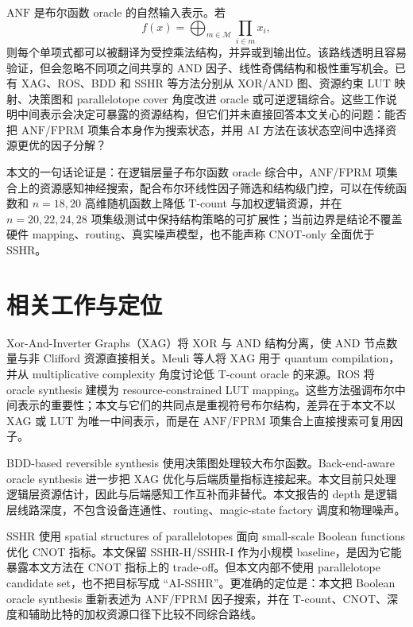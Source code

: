 \documentclass[UTF8,fontset=macnew,11pt]{ctexart}
\newcommand{\anf}{\ensuremath{\mathrm{ANF}}}
\newcommand{\fprm}{\ensuremath{\mathrm{FPRM}}}
\begin{document}
\anf{} 是布尔函数 oracle 的自然输入表示。若
\begin{equation}
  f(x)=\bigoplus_{m\in\mathcal{M}}\prod_{i\in m}x_i ,
  \label{eq:anf}
\end{equation}
则每个单项式都可以被翻译为受控乘法结构，并异或到输出位。该路线透明且容易验证，但会忽略不同项之间共享的 AND 因子、线性奇偶结构和极性重写机会。已有 XAG、ROS、BDD 和 SSHR 等方法分别从 XOR/AND 图、资源约束 LUT 映射、决策图和 parallelotope cover 角度改进 oracle 或可逆逻辑综合\cite{meuli2022xag,meuli2020ros,wille2009bdd,zheng2025sshr}。这些工作说明中间表示会决定可暴露的资源结构，但它们并未直接回答本文关心的问题：能否把 \anf{}/\fprm{} 项集合本身作为搜索状态，并用 AI 方法在该状态空间中选择资源更优的因子分解？

本文的一句话论证是：在逻辑层量子布尔函数 oracle 综合中，\anf{}/\fprm{} 项集合上的资源感知神经搜索，配合布尔环线性因子筛选和结构级门控，可以在传统函数和 $n=18,20$ 高维随机函数上降低 T-count 与加权逻辑资源，并在 $n=20,22,24,28$ 项集级测试中保持结构策略的可扩展性；当前边界是结论不覆盖硬件 mapping、routing、真实噪声模型，也不能声称 CNOT-only 全面优于 SSHR。

\section{相关工作与定位}

Xor-And-Inverter Graphs（XAG）将 XOR 与 AND 结构分离，使 AND 节点数量与非 Clifford 资源直接相关。Meuli 等人将 XAG 用于 quantum compilation\cite{meuli2022xag}，并从 multiplicative complexity 角度讨论低 T-count oracle 的来源\cite{meuli2019multiplicative}。ROS 将 oracle synthesis 建模为 resource-constrained LUT mapping\cite{meuli2020ros}。这些方法强调布尔中间表示的重要性；本文与它们的共同点是重视符号布尔结构，差异在于本文不以 XAG 或 LUT 为唯一中间表示，而是在 \anf{}/\fprm{} 项集合上直接搜索可复用因子。

BDD-based reversible synthesis 使用决策图处理较大布尔函数\cite{wille2009bdd}。Back-end-aware oracle synthesis 进一步把 XAG 优化与后端质量指标连接起来\cite{yu2025backend}。本文目前只处理逻辑层资源估计，因此与后端感知工作互补而非替代。本文报告的 depth 是逻辑层线路深度，不包含设备连通性、routing、magic-state factory 调度和物理噪声。

SSHR 使用 spatial structures of parallelotopes 面向 small-scale Boolean functions 优化 CNOT 指标\cite{zheng2025sshr}。本文保留 SSHR-H/SSHR-I 作为小规模 baseline，是因为它能暴露本文方法在 CNOT 指标上的 trade-off。但本文内部不使用 parallelotope candidate set，也不把目标写成 ``AI-SSHR''。更准确的定位是：本文把 Boolean oracle synthesis 重新表述为 \anf{}/\fprm{} 因子搜索，并在 T-count、CNOT、深度和辅助比特的加权资源口径下比较不同综合路线。
\end{document}
